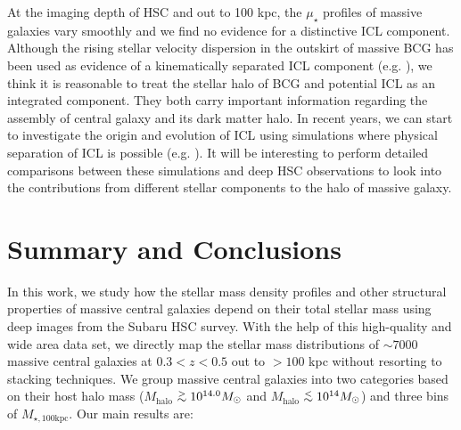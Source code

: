 \documentclass[a4paper,fleqn,usenatbib]{mnras}
\def\simlt{\lower.5ex\hbox{$\; \buildrel < \over {\sim} \;$}}
\def\simgt{\lower.5ex\hbox{$\; \buildrel > \over {\sim} \;$}}
\def\mhalo{{$M_{\mathrm{halo}}$}}
\def\mtot{{$M_{\star,100\mathrm{kpc}}$}}
\def\mden{{$\mu_{\star}$}}
\begin{document}
    At the imaging depth of HSC and out to 100 kpc, the \mden{} profiles of massive 
    galaxies vary smoothly and we find no evidence for a distinctive ICL component. 
    Although the rising stellar velocity dispersion in the outskirt of massive BCG
    has been used as evidence of a kinematically separated ICL component (e.g. 
    \citealt{Dressler1979, Carter1999, Kelson2002, Bender2015, Longobardi2015}), 
    we think it is reasonable to treat the stellar halo of BCG and potential ICL as 
    an integrated component. 
    They both carry important information regarding the assembly of central galaxy 
    and its dark matter halo. 
    In recent years, we can start to investigate the origin and evolution of ICL using 
    simulations where physical separation of ICL is possible
    (e.g. \citealt{SommerLarsen2005, Murante2007, Martel2012, Cui2014, Cooper2015, 
    Harris2017}). 
    It will be interesting to perform detailed comparisons between these simulations 
    and deep HSC observations to look into the contributions from different stellar 
    components to the halo of massive galaxy.
    

\section{Summary and Conclusions}
    \label{sec:summary}
    
    In this work, we study how the stellar mass density profiles and other structural
    properties of massive central galaxies depend on their total stellar mass using 
    deep images from the Subaru HSC survey. 
    With the help of this high-quality and wide area data set, we directly map the 
    stellar mass distributions of ${\sim}7000$ massive central galaxies at 
    $0.3 < z < 0.5$ out to $>100$ kpc without resorting to stacking techniques. 
    We group massive central galaxies into two categories based on their host halo 
    mass (\mhalo{}$\simgt 10^{14.0} M_{\odot}$ and \mhalo{}$\simlt 10^{14} M_{\odot}$)
    and three bins of \mtot{}.  
    Our main results are:  
    
\end{document}
